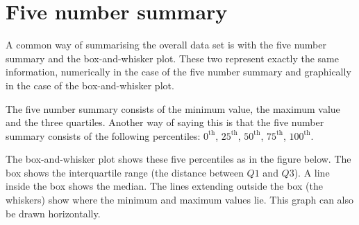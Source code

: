 \section{Five number summary}
A common way of summarising the overall data set is with the five
number summary and the box-and-whisker plot. These two represent
exactly the same information, numerically in the case of the five
number summary and graphically in the case of the box-and-whisker
plot.

\par
The five number summary consists of the minimum value, the maximum
value and the three quartiles. Another way of saying this is that the
five number summary consists of the following percentiles: $0^{\mathrm{th}}$,
$25^{\mathrm{th}}$, $50^{\mathrm{th}}$, $75^{\mathrm{th}}$, $100^{\mathrm{th}}$.

The box-and-whisker plot shows these five percentiles as in the figure
below. The box shows the interquartile range (the distance between $Q1$ and $Q3$). A line inside the box shows the
median. The lines extending outside the box (the whiskers) show where
the minimum and maximum values lie. This graph can also be drawn horizontally.
\par
{}
\clearpage
\begin{figure}[t]
  \begin{center}
  \end{center}
\end{figure}
\vspace{1cm}

